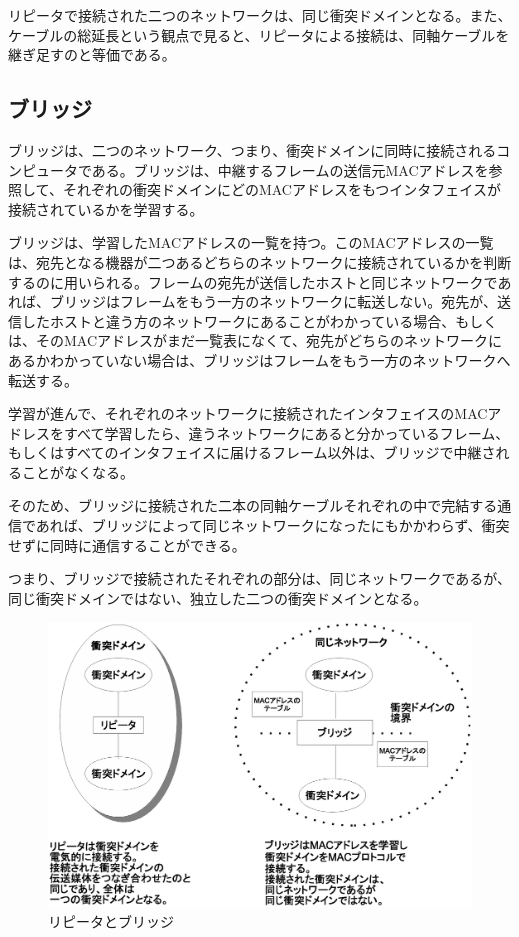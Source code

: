 リピータで接続された二つのネットワークは、同じ衝突ドメインとなる。また、ケーブルの総延長という観点で見ると、リピータによる接続は、同軸ケーブルを継ぎ足すのと等価である。

\subsection{ブリッジ}

ブリッジは、二つのネットワーク、つまり、衝突ドメインに同時に接続されるコンピュータである。ブリッジは、中継するフレームの送信元MACアドレスを参照して、それぞれの衝突ドメインにどのMACアドレスをもつインタフェイスが接続されているかを学習する。

ブリッジは、学習したMACアドレスの一覧を持つ。このMACアドレスの一覧は、宛先となる機器が二つあるどちらのネットワークに接続されているかを判断するのに用いられる。フレームの宛先が送信したホストと同じネットワークであれば、ブリッジはフレームをもう一方のネットワークに転送しない。宛先が、送信したホストと違う方のネットワークにあることがわかっている場合、もしくは、そのMACアドレスがまだ一覧表になくて、宛先がどちらのネットワークにあるかわかっていない場合は、ブリッジはフレームをもう一方のネットワークへ転送する。

学習が進んで、それぞれのネットワークに接続されたインタフェイスのMACアドレスをすべて学習したら、違うネットワークにあると分かっているフレーム、もしくはすべてのインタフェイスに届けるフレーム以外は、ブリッジで中継されることがなくなる。

そのため、ブリッジに接続された二本の同軸ケーブルそれぞれの中で完結する通信であれば、ブリッジによって同じネットワークになったにもかかわらず、衝突せずに同時に通信することができる。

つまり、ブリッジで接続されたそれぞれの部分は、同じネットワークであるが、同じ衝突ドメインではない、独立した二つの衝突ドメインとなる。

\begin{figure}[htbp]
	\includegraphics[width=12cm,clip]{draw/repeaterbridge.eps}
	\caption{リピータとブリッジ}
	\label{fig:repeaterbridge}
\end{figure}

